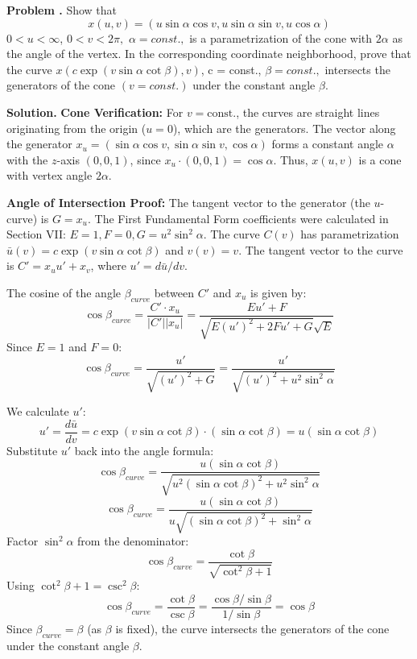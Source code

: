 \documentclass[12pt, a4paper, oneside]{article}
\newcounter{problemname}
\newenvironment{problem}
  {\begin{shaded}\stepcounter{problemname}\par\noindent\textbf{Problem \arabic{problemname}.
}\newline}
  {\end{shaded}\par}
\newenvironment{solution}
  {\par\noindent\textbf{Solution. }\newline}
  {\par}
\begin{document}
\begin{problem}
Show that
$$x(u,v)=(u \sin\alpha \cos v, u \sin\alpha \sin v, u \cos \alpha)$$
$0<u<\infty$, $0<v<2\pi,$ $\alpha=const.,$
is a parametrization of the cone with $2\alpha$ as the angle of the vertex.
In the corresponding coordinate neighborhood, prove that the curve
$x(c \exp(v \sin\alpha \cot\beta), v)$, c = const., $\beta=const.,$
intersects the generators of the cone $(v=const.)$ under the constant angle $\beta$.
\end{problem}

\begin{solution}
\textbf{Cone Verification:}
For $v=\text{const.}$, the curves are straight lines originating from the origin ($u=0$), which are the generators. The vector along the generator $x_u = (\sin\alpha \cos v, \sin\alpha \sin v, \cos\alpha)$ forms a constant angle $\alpha$ with the $z$-axis $(0, 0, 1)$, since $x_u \cdot (0, 0, 1) = \cos\alpha$. Thus, $x(u, v)$ is a cone with vertex angle $2\alpha$.

\textbf{Angle of Intersection Proof:}
The tangent vector to the generator (the $u$-curve) is $G = x_u$.
The First Fundamental Form coefficients were calculated in Section VII: $E=1, F=0, G=u^2 \sin^2\alpha$.
The curve $C(v)$ has parametrization $\bar{u}(v) = c \exp(v \sin\alpha \cot\beta)$ and $v(v) = v$.
The tangent vector to the curve is $C' = x_u u' + x_v$, where $u' = d\bar{u}/dv$.

The cosine of the angle $\beta_{curve}$ between $C'$ and $x_u$ is given by:
$$\cos\beta_{curve} = \frac{C' \cdot x_u}{|C'||x_u|} = \frac{E u' + F}{\sqrt{E (u')^2 + 2 F u' + G} \sqrt{E}}$$Since $E=1$ and $F=0$:$$\cos\beta_{curve} = \frac{u'}{\sqrt{(u')^2 + G}} = \frac{u'}{\sqrt{(u')^2 + u^2 \sin^2\alpha}}$$

We calculate $u'$:
$$u' = \frac{d\bar{u}}{dv} = c \exp(v \sin\alpha \cot\beta) \cdot (\sin\alpha \cot\beta) = u (\sin\alpha \cot\beta)$$Substitute $u'$ back into the angle formula:$$\cos\beta_{curve} = \frac{u (\sin\alpha \cot\beta)}{\sqrt{u^2 (\sin\alpha \cot\beta)^2 + u^2 \sin^2\alpha}}$$
$$\cos\beta_{curve} = \frac{u (\sin\alpha \cot\beta)}{u \sqrt{(\sin\alpha \cot\beta)^2 + \sin^2\alpha}}$$Factor $\sin^2\alpha$ from the denominator:$$\cos\beta_{curve} = \frac{\cot\beta}{\sqrt{\cot^2\beta + 1}}$$Using $\cot^2\beta + 1 = \csc^2\beta$:$$\cos\beta_{curve} = \frac{\cot\beta}{\csc\beta} = \frac{\cos\beta/\sin\beta}{1/\sin\beta} = \cos\beta$$
Since $\beta_{curve} = \beta$ (as $\beta$ is fixed), the curve intersects the generators of the cone under the constant angle $\beta$.
\end{solution}
\end{document}
